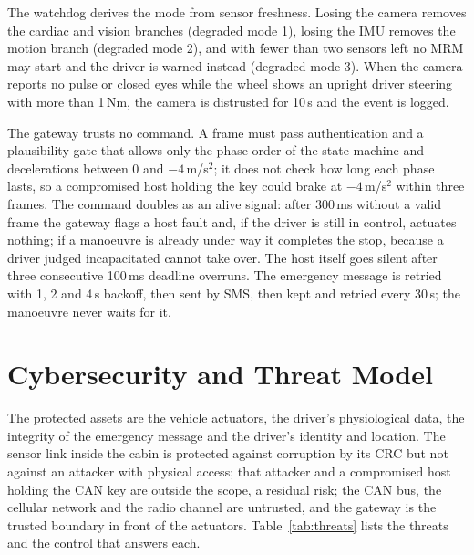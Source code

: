 \documentclass[conference]{IEEEtran}
\begin{document}
The watchdog derives the mode from sensor freshness. Losing the camera removes the cardiac and vision branches (degraded mode 1), losing the IMU removes the motion branch (degraded mode 2), and with fewer than two sensors left no MRM may start and the driver is warned instead (degraded mode 3). When the camera reports no pulse or closed eyes while the wheel shows an upright driver steering with more than 1\,Nm, the camera is distrusted for 10\,s and the event is logged.

The gateway trusts no command. A frame must pass authentication and a plausibility gate that allows only the phase order of the state machine and decelerations between 0 and $-4$\,m/s$^2$; it does not check how long each phase lasts, so a compromised host holding the key could brake at $-4$\,m/s$^2$ within three frames. The command doubles as an alive signal: after 300\,ms without a valid frame the gateway flags a host fault and, if the driver is still in control, actuates nothing; if a manoeuvre is already under way it completes the stop, because a driver judged incapacitated cannot take over. The host itself goes silent after three consecutive 100\,ms deadline overruns. The emergency message is retried with 1, 2 and 4\,s backoff, then sent by SMS, then kept and retried every 30\,s; the manoeuvre never waits for it.

\section{Cybersecurity and Threat Model}
The protected assets are the vehicle actuators, the driver's physiological data, the integrity of the emergency message and the driver's identity and location. The sensor link inside the cabin is protected against corruption by its CRC but not against an attacker with physical access; that attacker and a compromised host holding the CAN key are outside the scope, a residual risk; the CAN bus, the cellular network and the radio channel are untrusted, and the gateway is the trusted boundary in front of the actuators. Table~\ref{tab:threats} lists the threats and the control that answers each.
\end{document}
